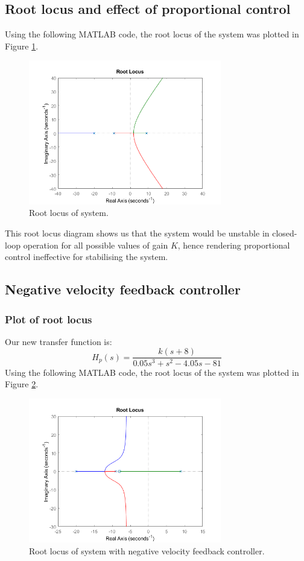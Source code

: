 \documentclass[11pt]{article}
\numberwithin{equation}{section}
\begin{document}
\subsection{Root locus and effect of proportional control}
Using the following MATLAB code, the root locus of the system was plotted in Figure \ref{q3b}.

\begin{figure}[H]
    \centering
    \includegraphics[width = 0.75\textwidth]{./img/q3b.png}
    \caption{Root locus of system.}
    \label{q3b}
\end{figure}
This root locus diagram shows us that the system would be unstable in closed-loop operation for all possible values of gain $K$, hence rendering proportional control ineffective for stabilising the system.
\subsection{Negative velocity feedback controller}
\subsubsection{Plot of root locus}
Our new transfer function is:
\begin{equation}
    H_p(s) = \frac{k\left(s+8\right)}{0.05s^3 + s^2 -4.05s - 81}
\end{equation}
Using the following MATLAB code, the root locus of the system was plotted in Figure \ref{q3ci}.

\begin{figure}[H]
    \centering
    \includegraphics[width = 0.75\textwidth]{./img/q3ci.png}
    \caption{Root locus of system with negative velocity feedback controller.}
    \label{q3ci}
\end{figure}
\end{document}
